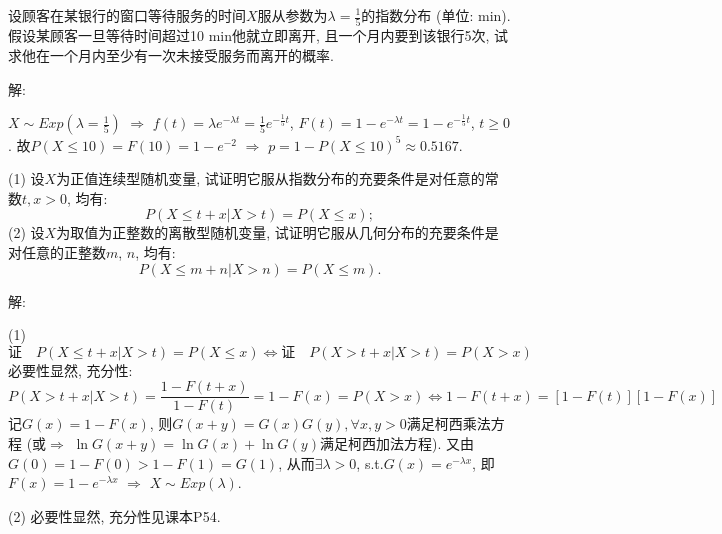 \documentclass[standard]{ExBook}
\begin{document}
\begin{qitems}
\vspace{-5em}

    \begin{bbox}
    \begin{shaded}
        \qitem
设顾客在某银行的窗口等待服务的时间$X$服从参数为$\lambda=\displaystyle\frac{1}{5}$的指数分布 (单位: min). 假设某顾客一旦等待时间超过10 min他就立即离开, 且一个月内要到该银行5次, 试求他在一个月内至少有一次未接受服务而离开的概率.
    \end{shaded}
    \end{bbox}

\vspace{-5em}

    \begin{bbox}
解: 

$X\sim Exp(\lambda=\frac{1}{5})$ $\Longrightarrow$ $f(t)=\lambda e^{-\lambda t}=\frac{1}{5}e^{-\frac{1}{5}t}$, $F(t)=1-e^{-\lambda t}=1-e^{-\frac{1}{5}t}$, $t\geq 0$. 故$P(X \leq 10)=F(10)=1-e^{-2}$ $\Longrightarrow$ $p=1-P(X \leq 10)^5\approx0.5167$.
    \end{bbox}

\vspace{-5em}

    \begin{bbox}
    \begin{shaded}
        \qitem
(1) 设$X$为正值连续型随机变量, 试证明它服从指数分布的充要条件是对任意的常数$t,x > 0$, 均有:
$$P(X \leq t+x|X>t)=P(X \leq x);$$
(2) 设$X$为取值为正整数的离散型随机变量, 试证明它服从几何分布的充要条件是对任意的正整数$m$, $n$, 均有:
$$P(X \leq m+n|X>n)=P(X \leq m).$$
    \end{shaded}
    \end{bbox}

\vspace{-5em}

    \begin{bbox}
解: 

(1)
$$\text{证}\quad P(X \leq t+x|X>t)=P(X \leq x) \Longleftrightarrow \text{证}\quad P(X > t+x|X>t)=P(X > x)$$
必要性显然, 充分性:
$$P(X > t+x|X>t)=\frac{1-F(t+x)}{1-F(t)}=1-F(x)=P(X>x) \Longleftrightarrow 1-F(t+x)=[1-F(t)][1-F(x)]$$
记$G(x)=1-F(x)$, 则$G(x+y)=G(x)G(y),\forall x,y>0$满足柯西乘法方程 (或$\Longrightarrow$ $\ln G(x+y)=\ln G(x)+\ln G(y)$满足柯西加法方程). 又由$G(0)=1-F(0)>1-F(1)=G(1)$, 从而$\exists\lambda>0$, s.t.$G(x)=e^{-\lambda x}$, 即$F(x)=1-e^{-\lambda x}$ $\Longrightarrow$ $X\sim Exp(\lambda)$.

(2) 必要性显然, 充分性见课本P54.


\end{bbox}
\end{qitems}
\end{document}
